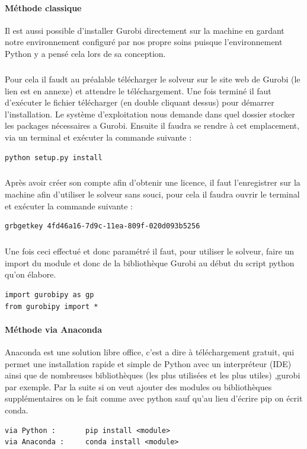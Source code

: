 \documentclass[a4paper, 12pt, twoside]{article}
\begin{document}
\paragraph{Méthode classique }Il est aussi possible d'installer \textsf{Gurobi} directement sur la machine en gardant notre environnement configuré par nos propre soins puisque l'environnement Python y a  pensé cela lors de sa conception.
\subparagraph{}{Pour cela il faudt au préalable télécharger le solveur sur le site web de \textsf{Gurobi} (le lien est en annexe) et attendre le téléchargement. Une fois terminé il faut d'exécuter le fichier télécharger (en double cliquant dessus) pour démarrer l'installation. Le système d'exploitation nous demande dans quel dossier stocker les packages nécessaires a \textsf{Gurobi}. Ensuite il faudra se rendre à cet emplacement, via un terminal et exécuter la commande suivante :}
\begin{verbatim}
python setup.py install
\end{verbatim}
\subparagraph{}{Après avoir créer son compte afin d'obtenir une licence, il faut l'enregistrer sur la machine afin d'utiliser le solveur sans souci, pour cela il faudra ouvrir le terminal et exécuter la commande suivante :}
\begin{verbatim}
grbgetkey 4fd46a16-7d9c-11ea-809f-020d093b5256
\end{verbatim}
\subparagraph{}{Une fois ceci effectué et donc paramétré il faut, pour utiliser le solveur, faire un \textsf{import} du module et donc de la bibliothèque \textsf{Gurobi} au début du script python qu'on élabore.}
\begin{verbatim}
import gurobipy as gp
from gurobipy import *
\end{verbatim}

\paragraph{Méthode via Anaconda}{Anaconda est une solution libre office, c'est a dire à téléchargement gratuit, qui permet une installation rapide et simple de \textsf{Python} avec un interpréteur (IDE) ainsi que de nombreuses bibliothèques (les plus utilisées et les plus utiles) ,gurobi par exemple. Par la suite si on veut ajouter des modules ou bibliothèques supplémentaires on le fait comme avec python sauf qu'au lieu d'écrire \textsf{pip} on écrit \textsf{conda}}.
\begin{verbatim}
via Python :       pip install <module>
via Anaconda :     conda install <module>
\end{verbatim}
\end{document}
